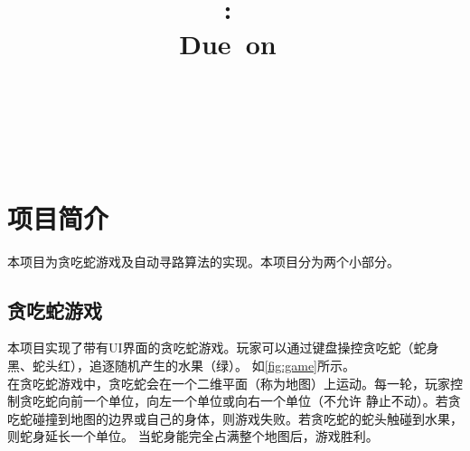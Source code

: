 \documentclass[a4paper]{article}
\title{
\vspace{2in}
\textmd{\textbf{\hmwkClass:\ \hmwkTitle}}\\
\normalsize\vspace{0.1in}\small{Due\ on\ \hmwkDueDate}\\
\vspace{0.1in}\large{\textit{\hmwkClassInstructor\ \hmwkClassTime}}
\vspace{3in}
}
\author{\textbf{\LARGE{\hmwkAuthorName}} \\ \\ \textbf{\LARGE{\hmwkAuthorId}}}
\date{} %
\begin{document}

\maketitle




\renewcommand{\contentsname}{Content} %
\newpage
\tableofcontents
{}
\newpage



\section{项目简介}
本项目为贪吃蛇游戏及自动寻路算法的实现。本项目分为两个小部分。
\subsection{贪吃蛇游戏}
本项目实现了带有UI界面的贪吃蛇游戏。玩家可以通过键盘操控贪吃蛇（蛇身黑、蛇头红），追逐随机产生的水果（绿）。
如\autoref{fig:game}所示。\\

在贪吃蛇游戏中，贪吃蛇会在一个二维平面（称为地图）上运动。每一轮，玩家控制贪吃蛇向前一个单位，向左一个单位或向右一个单位（不允许
静止不动）。若贪吃蛇碰撞到地图的边界或自己的身体，则游戏失败。若贪吃蛇的蛇头触碰到水果，则蛇身延长一个单位。
当蛇身能完全占满整个地图后，游戏胜利。
\end{document}
